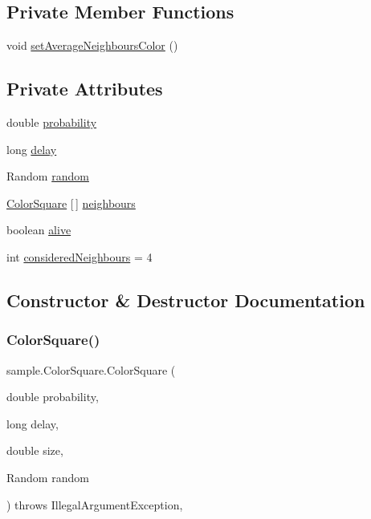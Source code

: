 \subsection*{Private Member Functions}
\begin{DoxyCompactItemize}
\item 
void \mbox{\hyperlink{classsample_1_1_color_square_a47856df2afb0e0dcdf11dfe5801570c9}{set\+Average\+Neighbours\+Color}} ()
\end{DoxyCompactItemize}
\subsection*{Private Attributes}
\begin{DoxyCompactItemize}
\item 
double \mbox{\hyperlink{classsample_1_1_color_square_af4e8f71262ff634ecd5d6261853b023d}{probability}}
\item 
long \mbox{\hyperlink{classsample_1_1_color_square_ac96754f907bed6644d7a18e5992af853}{delay}}
\item 
Random \mbox{\hyperlink{classsample_1_1_color_square_a398146a0cc15168fc6fbe5aac3e9f50b}{random}}
\item 
\mbox{\hyperlink{classsample_1_1_color_square}{Color\+Square}} \mbox{[}$\,$\mbox{]} \mbox{\hyperlink{classsample_1_1_color_square_a262acfde2a2981d945f37c9600904ff1}{neighbours}}
\item 
boolean \mbox{\hyperlink{classsample_1_1_color_square_ac89c88958f422f4b2293215274f1d958}{alive}}
\item 
int \mbox{\hyperlink{classsample_1_1_color_square_aa261ae0dcf7928c1b8f6ac86ecb3f1de}{considered\+Neighbours}} = 4
\end{DoxyCompactItemize}


\subsection{Constructor \& Destructor Documentation}
\mbox{\label{classsample_1_1_color_square_a2273dc7c774e92a81ce858facc815ec7}} 
\subsubsection{\texorpdfstring{Color\+Square()}{ColorSquare()}}
{\footnotesize\ttfamily sample.\+Color\+Square.\+Color\+Square (\begin{DoxyParamCaption}\item[{double}]{probability,  }\item[{long}]{delay,  }\item[{double}]{size,  }\item[{Random}]{random }\end{DoxyParamCaption}) throws Illegal\+Argument\+Exception\hspace{0.3cm}{\ttfamily [inline]}, {\ttfamily [package]}}


